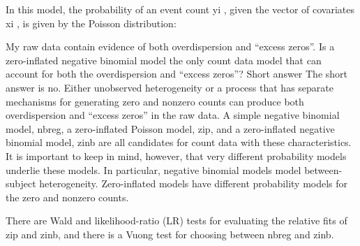 In this model, the probability of an event count yi , given the
vector of covariates xi , is given by the Poisson distribution:




My raw data contain evidence of both overdispersion and “excess zeros”. Is a zero-inflated negative binomial model the only count data model that can account for both the overdispersion and “excess zeros”? 
Short answer
 The short answer is no. Either unobserved heterogeneity or a process that has separate mechanisms for generating zero and nonzero counts can produce both overdispersion and “excess zeros” in the raw data. A simple negative binomial model, nbreg, a zero-inflated Poisson model, zip, and a zero-inflated negative binomial model, zinb are all candidates for count data with these characteristics. It is important to keep in mind, however, that very different probability models underlie these models. In particular, negative binomial models model between-subject heterogeneity. Zero-inflated models have different probability models for the zero and nonzero counts.
 
There are Wald and likelihood-ratio (LR) tests for evaluating the relative fits of zip and zinb, and there is a Vuong test for choosing between nbreg and zinb.
 
 
 
 
